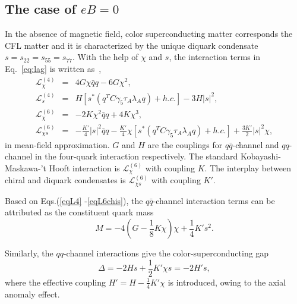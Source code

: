 \documentclass[prd, showpacs,nofootinbib,amsmath,amssymb,12pt]{revtex4}
\begin{document}
\subsection{The case of  $eB = 0$}
In the absence of magnetic field,  color superconducting  matter corresponds the CFL matter and it is characterized by the unique diquark condensate $s=s_{22}=s_{55}=s_{77}$.
With the help of $\chi$ and $s$, the interaction terms in Eq.~\eqref{eq:lag} is written as~\cite{abuki2010nambu},  
\begin{eqnarray}
\mathcal{L}^{(4)}_{\chi} &=& 4G\chi\bar{q}q-6G\chi^2,  \label{eqL4} \\
\mathcal{L}^{(4)}_{s} &=& H[s^*(q^TC\gamma_5\tau_A\lambda_Aq)+h.c.]-3H|s|^2,  \label{eqL4s} \\
\mathcal{L}^{\left(6\right)}_{\chi} &=& -2K\chi^2\bar{q}q+4K\chi^3, \label{eqL6chi}  \\ 
\mathcal{L}^{\left(6\right)}_{\chi s} &=& -\frac{K'}{4}|s|^2\bar{q}q-\frac{K'}{4}\chi[s^*(q^TC\gamma_5\tau_A\lambda_Aq)+h.c.]+\frac{3K'}{2}|s|^2\chi, \label{eqL6chis}
\end{eqnarray}
in  mean-field approximation.
 $G$ and $H$ are the couplings for $q\bar{q}$-channel and $qq$-channel in the four-quark interaction respectively.
 The standard Kobayashi-Maskawa-'t Hooft interaction is $\mathcal{L}^{\left(6\right)}_{\chi}$ with coupling $K$.
The interplay between chiral and diquark condensates is $\mathcal{L}^{\left(6\right)}_{\chi s}$ with coupling $K'$.

Based on Eqs.(\ref{eqL4} -\ref{eqL6chis}), 
 the $q\bar{q}$-channel interaction terms can be attributed as  the constituent quark mass
\begin{equation}
M = -4(G-\frac{1}{8}K\chi)\chi + \frac{1}{4}K's^2.
\label{Dmass}
\end{equation}

Similarly, the $qq$-channel  interactions give the color-superconducting gap
\begin{equation}
\label{eq:heffective}
\Delta=-2Hs+\frac{1}{2}K'\chi s =-2H's,
\end{equation}
where the effective coupling $H'=H - \frac{1}{4}K'\chi$ 
is introduced, owing to the axial anomaly effect.
\end{document}
